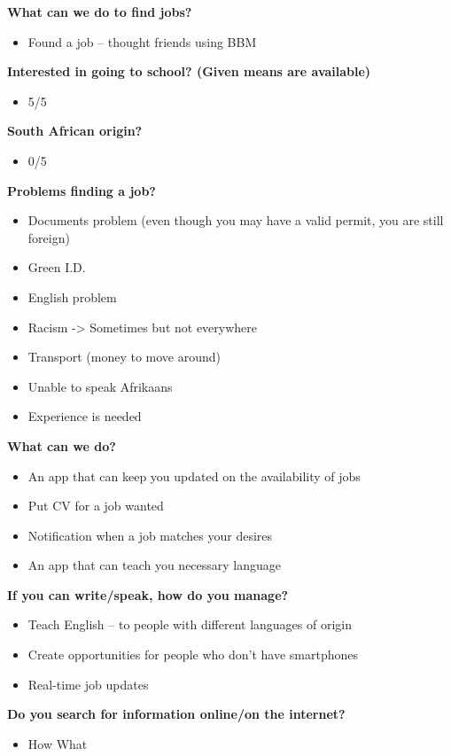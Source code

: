 \noindent\textbf{What can we do to find jobs?}
\begin{itemize}
\item Found a job – thought friends using BBM
\end{itemize}

\noindent\textbf{Interested in going to school? (Given means are available)}
\begin{itemize}
\item 5/5
\end{itemize}

\noindent\textbf{South African origin?}
\begin{itemize}
\item 0/5
\end{itemize}

\noindent\textbf{Problems finding a job?}
\begin{itemize}
\item Documents problem (even though you may have a valid permit, you are still foreign)
\item Green I.D.
\item English problem
\item Racism -> Sometimes but not everywhere
\item Transport (money to move around)
\item Unable to speak Afrikaans
\item Experience is needed
\end{itemize}

\noindent\textbf{What can we do?}
\begin{itemize}
\item An app that can keep you updated on the availability of jobs
\item Put CV for a job wanted
\item Notification when a job matches your desires
\item An app that can teach you necessary language
\end{itemize}

\noindent\textbf{If you can write/speak, how do you manage?}
\begin{itemize}
\item Teach English – to people with different languages of origin
\item Create opportunities for people who don’t have smartphones
\item Real-time job updates
\end{itemize}

\noindent\textbf{Do you search for information online/on the internet?}
\begin{itemize}
\item How What
\end{itemize}